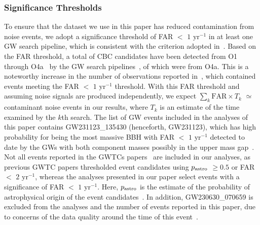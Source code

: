\subsubsection{Significance Thresholds}
To ensure that the dataset we use in this paper has reduced contamination 
from noise events, we adopt a significance threshold of \ac{FAR} 
$<$ $1$ $\text{yr}^{-1}$ in at least one \ac{GW} search pipeline, 
which is consistent with the criterion adopted in~\citet{KAGRA:2021duu}. 
Based on the \ac{FAR} threshold, a total of \samplePurityEstimate[totalNumEvents]
\ac{CBC} candidates have been detected from \ac{O1} through 
\ac{O4a}~\citep{LIGOScientific:2018mvr, LIGOScientific:2020ibl, LIGOScientific:2021usb, KAGRA:2021vkt}
by the \ac{GW} search pipelines~\citep{GWTC:Results}, 
of which  were from \ac{O4a}.
This is a noteworthy increase in the number of observations reported in~\citet{KAGRA:2021vkt}, 
which contained \samplePurityEstimate[totalNumEventsGWTC3] events 
meeting the \ac{FAR} $<$ $1$ $\text{yr}^{-1}$ threshold. 
With this \ac{FAR} threshold and assuming noise signals are produced 
independently, we expect 
$\sum_k \mathrm{FAR} \times T_k$ ${\simeq}$ \samplePurityEstimate[expectedNumFalseTrialsFactor][rounded]
contaminant noise events in our results, where $T_k$ is an estimate of the time 
examined by the $k$th search.
The list of \ac{GW} events included in the analyses of this paper contains 
GW231123\_135430 (henceforth, GW231123), which has high probability for being 
the most massive \ac{BBH} with \ac{FAR} $<$ $1$ $\text{yr}^{-1}$ detected to 
date by the \acp{GW} with both component masses possibly in the upper mass 
gap~\citep{GW231123, Woosley:2016hmi, Mapelli:2019ipt, Farmer:2019jed, Farmer:2020xne, Woosley:2021xba, Hendriks:2023yrw}.
Not all events reported in the \acp{GWTC} 
papers~\citep{LIGOScientific:2018mvr, LIGOScientific:2020ibl, LIGOScientific:2021usb, KAGRA:2021vkt, GWTC:Results} 
are included in our analyses, as previous \ac{GWTC} papers thresholded event 
candidates using $p_{\rm astro}$ $\geq 0.5$ or \ac{FAR} $<$ $2$ $\text{yr}^{-1}$, 
whereas the analyses presented 
in our paper select events with a significance of \ac{FAR} $<$ $1$ $\text{yr}^{-1}$. 
Here, $p_{\rm astro}$ is the estimate of the probability of astrophysical
origin of the event candidates~\citep{GWTC:Methods, GWTC:Results}.
In addition, GW230630\_070659 is excluded from the analyses and the number of 
events reported in this paper, due to concerns of the data quality around the 
time of this event~\citep{GWTC:Results}.

